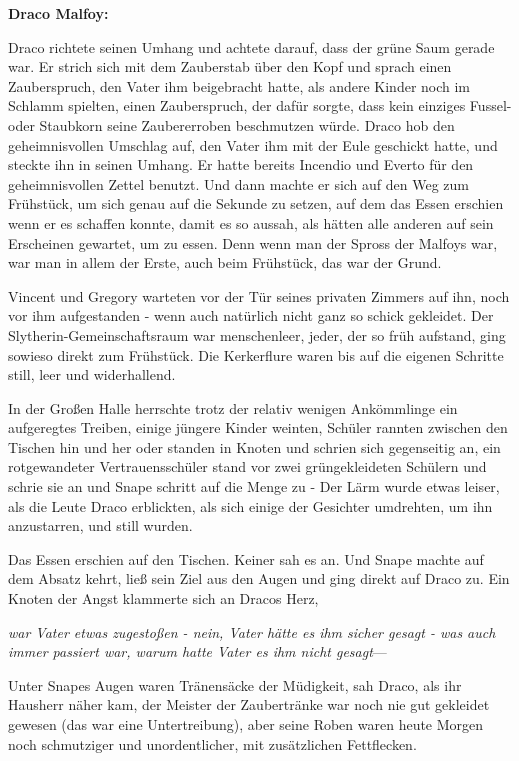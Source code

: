 {\textbf{Draco Malfoy:}

Draco richtete seinen Umhang und achtete darauf, dass der grüne Saum gerade war. Er strich sich mit dem Zauberstab über den Kopf und sprach einen Zauberspruch, den Vater ihm beigebracht hatte, als andere Kinder noch im Schlamm spielten, einen Zauberspruch, der dafür sorgte, dass kein einziges Fussel- oder Staubkorn seine Zaubererroben beschmutzen würde. Draco hob den geheimnisvollen Umschlag auf, den Vater ihm mit der Eule geschickt hatte, und steckte ihn in seinen Umhang. Er hatte bereits Incendio und Everto für den geheimnisvollen Zettel benutzt. Und dann machte er sich auf den Weg zum Frühstück, um sich genau auf die Sekunde zu setzen, auf dem das Essen erschien wenn er es schaffen konnte, damit es so aussah, als hätten alle anderen auf sein Erscheinen gewartet, um zu essen. Denn wenn man der Spross der Malfoys war, war man in allem der Erste, auch beim Frühstück, das war der Grund.

Vincent und Gregory warteten vor der Tür seines privaten Zimmers auf ihn, noch vor ihm aufgestanden - wenn auch natürlich nicht ganz so schick gekleidet. Der Slytherin-Gemeinschaftsraum war menschenleer, jeder, der so früh aufstand, ging sowieso direkt zum Frühstück. Die Kerkerflure waren bis auf die eigenen Schritte still, leer und widerhallend.

In der Großen Halle herrschte trotz der relativ wenigen Ankömmlinge ein aufgeregtes Treiben, einige jüngere Kinder weinten, Schüler rannten zwischen den Tischen hin und her oder standen in Knoten und schrien sich gegenseitig an, ein rotgewandeter Vertrauensschüler stand vor zwei grüngekleideten Schülern und schrie sie an und Snape schritt auf die Menge zu - Der Lärm wurde etwas leiser, als die Leute Draco erblickten, als sich einige der Gesichter umdrehten, um ihn anzustarren, und still wurden.

Das Essen erschien auf den Tischen. Keiner sah es an. Und Snape machte auf dem Absatz kehrt, ließ sein Ziel aus den Augen und ging direkt auf Draco zu. Ein Knoten der Angst klammerte sich an Dracos Herz,

\emph{war Vater etwas zugestoßen - nein, Vater hätte es ihm sicher gesagt - was auch immer passiert war, warum hatte Vater es ihm nicht gesagt}—

Unter Snapes Augen waren Tränensäcke der Müdigkeit, sah Draco, als ihr Hausherr näher kam, der Meister der Zaubertränke war noch nie gut gekleidet gewesen (das war eine Untertreibung), aber seine Roben waren heute Morgen noch schmutziger und unordentlicher, mit zusätzlichen Fettflecken.

}
